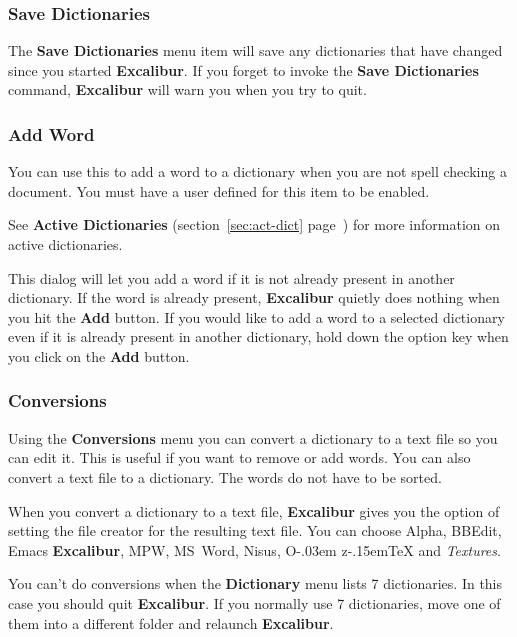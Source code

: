 \documentclass[11pt,titlepage]{article}
\newcommand{\ex}{\textbf{Excalibur}}
\newcommand{\oz}{O\kern-.03em z\kern-.15em\TeX}
\newcommand{\textures}{\emph{Textures}}
\begin{document}
\subsubsection{Save Dictionaries}

The \textbf{Save Dictionaries} menu item will save any dictionaries
that have changed since you started \ex. If you forget to invoke the
\textbf{Save Dictionaries} command, \ex{} will warn you when you try
to quit.

\subsubsection{Add Word}

You can use this to add a word to a dictionary when you are not spell
checking a document. You must have a user defined
 for this item to be
enabled.
\begin{latexonly}
  See \textbf{Active Dictionaries} (section~\ref{sec:act-dict}
  page~\pageref{sec:act-dict}) for more information on active
  dictionaries.
\end{latexonly}

This dialog will let you add a word if it is not already present in
another dictionary.  If the word is already present, \ex{} quietly
does nothing when you hit the \textbf{Add} button.  If you would like
to add a word to a selected dictionary even if it is already present
in another dictionary, hold down the option key when you click on the
\textbf{Add} button.

\subsubsection{Conversions}

Using the \textbf{Conversions} menu you can convert a dictionary to a
text file so you can edit it. This is useful if you want to remove or
add words. You can also convert a text file to a dictionary. The words
do not have to be sorted.

When you convert a dictionary to a text file, \ex{} gives you the
option of setting the file creator for the resulting text file.  You
can choose Alpha, BBEdit, Emacs \ex, MPW, MS~Word, Nisus, \oz{} and
\textures.

You can't do conversions when the \textbf{Dictionary} menu lists 7
dictionaries. In this case you should quit \ex. If you normally use 7
dictionaries, move one of them into a different folder and relaunch
\ex.
\end{document}
